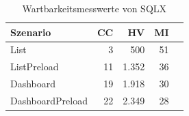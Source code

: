 \begin{table}[ht]
\centering
\caption{Wartbarkeitsmesswerte von SQLX}
\begin{tabular}{lrrrr}
\toprule
Szenario & CC & HV & MI \\
\midrule
	List & 3 & 500 & 51 \\
	ListPreload & 11 & 1.352 & 36 \\
	Dashboard & 19 & 1.918 & 30 \\
	DashboardPreload & 22 & 2.349 & 28 \\
\bottomrule
\end{tabular}
\label{tab:wartbarkeit_sqlx}
\end{table}
	